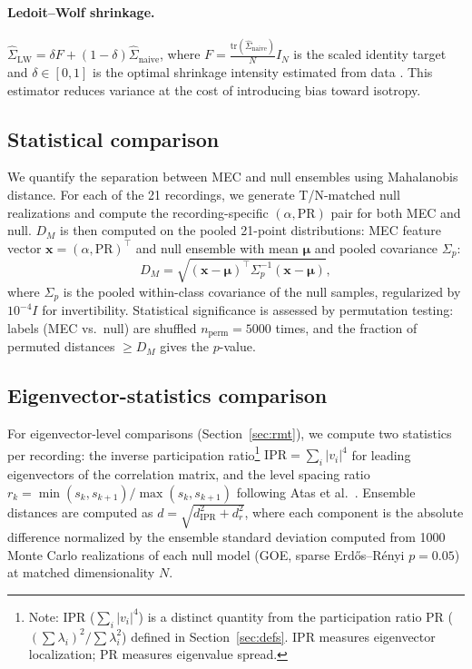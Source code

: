 \documentclass[aps,pre,reprint,twocolumn]{revtex4-2}
\begin{document}
\paragraph{Ledoit--Wolf shrinkage.}
$\hat{\Sigma}_{\text{LW}} = \delta F + (1-\delta) \hat{\Sigma}_{\text{naive}}$, where $F = \frac{\text{tr}(\hat{\Sigma}_{\text{naive}})}{N} I_N$ is the scaled identity target and $\delta \in [0,1]$ is the optimal shrinkage intensity estimated from data \cite{ledoit2004}. This estimator reduces variance at the cost of introducing bias toward isotropy.

\subsection{Statistical comparison}

We quantify the separation between MEC and null ensembles using Mahalanobis distance. For each of the 21 recordings, we generate T/N-matched null realizations and compute the recording-specific $(\alpha, \text{PR})$ pair for both MEC and null. $D_M$ is then computed on the pooled 21-point distributions: MEC feature vector $\mathbf{x} = (\alpha, \text{PR})^\top$ and null ensemble with mean $\boldsymbol{\mu}$ and pooled covariance $\Sigma_p$:
\begin{equation}
D_M = \sqrt{(\mathbf{x} - \boldsymbol{\mu})^\top \Sigma_p^{-1} (\mathbf{x} - \boldsymbol{\mu})},
\label{eq:mahal}
\end{equation}
where $\Sigma_p$ is the pooled within-class covariance of the null samples, regularized by $10^{-4} I$ for invertibility. Statistical significance is assessed by permutation testing: labels (MEC vs.\ null) are shuffled $n_{\text{perm}} = 5000$ times, and the fraction of permuted distances $\ge D_M$ gives the $p$-value.

\subsection{Eigenvector-statistics comparison}

For eigenvector-level comparisons (Section~\ref{sec:rmt}), we compute two statistics per recording: the inverse participation ratio\footnote{Note: IPR ($\sum_i |v_i|^4$) is a distinct quantity from the participation ratio PR ($(\sum \lambda_i)^2 / \sum \lambda_i^2$) defined in Section~\ref{sec:defs}. IPR measures eigenvector localization; PR measures eigenvalue spread.} $\text{IPR} = \sum_i |v_i|^4$ for leading eigenvectors of the correlation matrix, and the level spacing ratio $r_k = \min(s_k, s_{k+1})/\max(s_k, s_{k+1})$ following Atas et al.\ \cite{atas2013}. Ensemble distances are computed as $d = \sqrt{d_{\text{IPR}}^2 + d_r^2}$, where each component is the absolute difference normalized by the ensemble standard deviation computed from 1000 Monte Carlo realizations of each null model (GOE, sparse Erd\H{o}s--R\'{e}nyi $p=0.05$) at matched dimensionality $N$.
\end{document}

